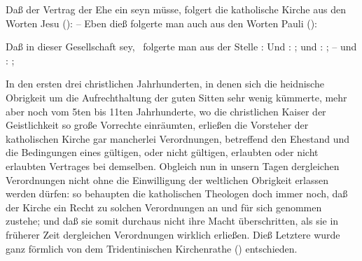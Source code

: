 \begin{aufza}
\item Daß der Vertrag der Ehe ein  seyn müsse, folgert die katholische Kirche aus den Worten Jesu ():  -- Eben dieß folgerte man auch aus den Worten Pauli (): 
\item Daß in dieser Gesellschaft  sey, \usw\ folgerte man aus der Stelle :  Und  : ; und : ; -- und : ; \usw\
\item In den ersten drei christlichen Jahrhunderten, in denen sich die heidnische Obrigkeit um die Aufrechthaltung der guten Sitten sehr wenig kümmerte, mehr aber noch vom 5ten bis 11ten Jahrhunderte, wo die christlichen Kaiser der Geistlichkeit so große Vorrechte einräumten, erließen die Vorsteher der katholischen Kirche gar mancherlei Verordnungen, betreffend den Ehestand und die Bedingungen eines gültigen, oder nicht gültigen, erlaubten oder nicht erlaubten Vertrages bei demselben. Obgleich nun in unsern Tagen dergleichen Verordnungen nicht ohne die Einwilligung der weltlichen Obrigkeit erlassen werden dürfen: so behaupten die katholischen Theologen doch immer noch, daß der Kirche ein Recht zu solchen Verordnungen an und für sich genommen zustehe; und daß sie somit durchaus nicht ihre Macht überschritten, als sie in früherer Zeit dergleichen Verordnungen wirklich erließen. Dieß Letztere wurde ganz förmlich von dem Tridentinischen Kirchenrathe () entschieden.

\end{aufza}
